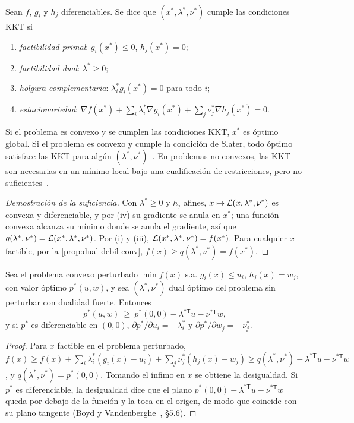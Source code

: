 \begin{teorema}\label{teo:kkt}
Sean $f$, $g_i$ y $h_j$ diferenciables. Se dice que $(x^{*},\lambda^{*},\nu^{*})$ cumple las condiciones KKT si
\begin{enumerate}
  \item \emph{factibilidad primal}: $g_i(x^{*})\le 0$, $h_j(x^{*})=0$;
  \item \emph{factibilidad dual}: $\lambda^{*}\ge 0$;
  \item \emph{holgura complementaria}: $\lambda_i^{*}g_i(x^{*})=0$ para todo $i$;
  \item \emph{estacionariedad}: $\nabla f(x^{*})+\sum_i\lambda_i^{*}\nabla g_i(x^{*})+\sum_j\nu_j^{*}\nabla h_j(x^{*})=0$.
\end{enumerate}
Si el problema es convexo y se cumplen las condiciones KKT, $x^{*}$ es óptimo global. Si el problema es convexo y cumple la condición de Slater, todo óptimo satisface las KKT para algún $(\lambda^{*},\nu^{*})$~\cite{bv}. En problemas no convexos, las KKT son necesarias en un mínimo local bajo una cualificación de restricciones, pero no suficientes~\cite{nw}.
\end{teorema}

\begin{proof}[Demostración de la suficiencia]
Con $\lambda^{*}\ge 0$ y $h_j$ afines, $x\mapsto\mathcal{L}(x,\lambda^{*},\nu^{*})$ es convexa y diferenciable, y por (iv) su gradiente se anula en $x^{*}$; una función convexa alcanza su mínimo donde se anula el gradiente, así que $q(\lambda^{*},\nu^{*})=\mathcal{L}(x^{*},\lambda^{*},\nu^{*})$. Por (i) y (iii), $\mathcal{L}(x^{*},\lambda^{*},\nu^{*})=f(x^{*})$. Para cualquier $x$ factible, por la \cref{prop:dual-debil-conv}, $f(x)\ge q(\lambda^{*},\nu^{*})=f(x^{*})$.
\end{proof}

\begin{proposicion}\label{prop:sensibilidad}
Sea el problema convexo perturbado $\min f(x)$ s.a. $g_i(x)\le u_i$, $h_j(x)=w_j$, con valor óptimo $p^{*}(u,w)$, y sea $(\lambda^{*},\nu^{*})$ dual óptimo del problema sin perturbar con dualidad fuerte. Entonces
\[
p^{*}(u,w)\ \ge\ p^{*}(0,0)-\lambda^{*\mathsf{T}}u-\nu^{*\mathsf{T}}w ,
\]
y si $p^{*}$ es diferenciable en $(0,0)$, $\partial p^{*}/\partial u_i=-\lambda_i^{*}$ y $\partial p^{*}/\partial w_j=-\nu_j^{*}$.
\end{proposicion}

\begin{proof}
Para $x$ factible en el problema perturbado, $f(x)\ge f(x)+\sum_i\lambda_i^{*}(g_i(x)-u_i)+\sum_j\nu_j^{*}(h_j(x)-w_j)\ge q(\lambda^{*},\nu^{*})-\lambda^{*\mathsf{T}}u-\nu^{*\mathsf{T}}w$, y $q(\lambda^{*},\nu^{*})=p^{*}(0,0)$. Tomando el ínfimo en $x$ se obtiene la desigualdad. Si $p^{*}$ es diferenciable, la desigualdad dice que el plano $p^{*}(0,0)-\lambda^{*\mathsf{T}}u-\nu^{*\mathsf{T}}w$ queda por debajo de la función y la toca en el origen, de modo que coincide con su plano tangente (Boyd y Vandenberghe~\cite{bv}, §5.6).
\end{proof}

